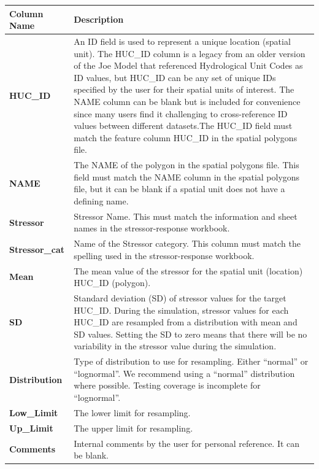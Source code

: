 \documentclass[
  letterpaper,
  DIV=11,
  numbers=noendperiod]{scrreprt}
\begin{document}
\begin{longtable}[]{@{}
  >{\raggedright\arraybackslash}p{}
  >{\raggedright\arraybackslash}p{}@{}}
\toprule\noalign{}
\begin{minipage}[b]{\linewidth}\raggedright
Column Name
\end{minipage} & \begin{minipage}[b]{\linewidth}\raggedright
Description
\end{minipage} \\
\midrule\noalign{}
\endhead
\bottomrule\noalign{}
\endlastfoot
\textbf{HUC\_ID} & An ID field is used to represent a unique location
(spatial unit). The HUC\_ID column is a legacy from an older version of
the Joe Model that referenced Hydrological Unit Codes as ID values, but
HUC\_ID can be any set of unique IDs specified by the user for their
spatial units of interest. The NAME column can be blank but is included
for convenience since many users find it challenging to cross-reference
ID values between different datasets.The HUC\_ID field must match the
feature column HUC\_ID in the spatial polygons file. \\
\textbf{NAME} & The NAME of the polygon in the spatial polygons file.
This field must match the NAME column in the spatial polygons file, but
it can be blank if a spatial unit does not have a defining name. \\
\textbf{Stressor} & Stressor Name. This must match the information and
sheet names in the stressor-response workbook. \\
\textbf{Stressor\_cat} & Name of the Stressor category. This column must
match the spelling used in the stressor-response workbook. \\
\textbf{Mean} & The mean value of the stressor for the spatial unit
(location) HUC\_ID (polygon). \\
\textbf{SD} & Standard deviation (SD) of stressor values for the target
HUC\_ID. During the simulation, stressor values for each HUC\_ID are
resampled from a distribution with mean and SD values. Setting the SD to
zero means that there will be no variability in the stressor value
during the simulation. \\
\textbf{Distribution} & Type of distribution to use for resampling.
Either ``normal'' or ``lognormal''. We recommend using a ``normal''
distribution where possible. Testing coverage is incomplete for
``lognormal''. \\
\textbf{Low\_Limit} & The lower limit for resampling. \\
\textbf{Up\_Limit} & The upper limit for resampling. \\
\textbf{Comments} & Internal comments by the user for personal
reference. It can be blank. \\
\end{longtable}
\end{document}
